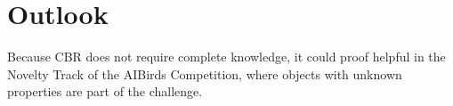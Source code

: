 \section{Outlook}\label{sec:outlook}


Because \ac{CBR} does not require complete knowledge, it could proof helpful in the Novelty Track of the AIBirds Competition, where objects with unknown properties are part of the challenge.

